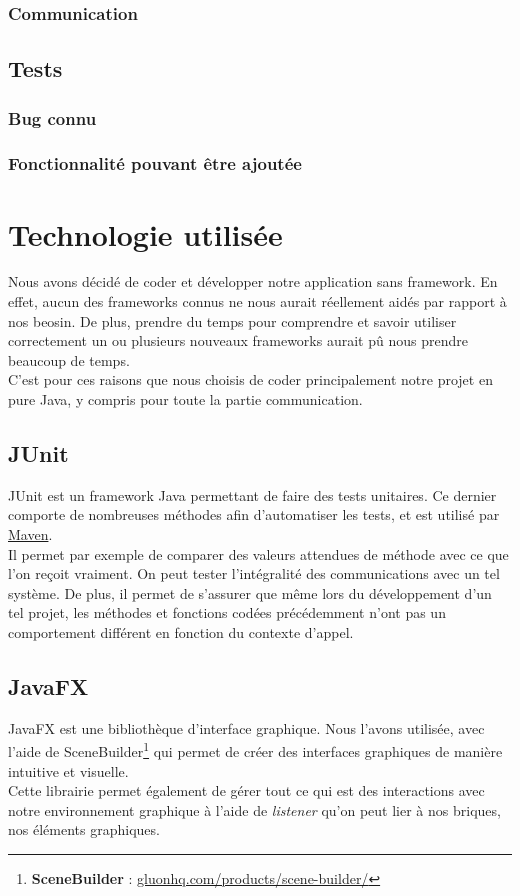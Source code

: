 \documentclass[a4paper,12pt]{article}
\begin{document}
		\subsubsection{Communication}
	
	\subsection{Tests}
	\subsubsection{Bug connu}
	
	\subsubsection{Fonctionnalité pouvant être ajoutée}
	
	\section{Technologie utilisée}
	Nous avons décidé de coder et développer notre application sans framework. En effet, aucun des frameworks connus ne nous aurait réellement aidés par rapport à nos beosin. De plus, prendre du temps pour comprendre et savoir utiliser correctement un ou plusieurs nouveaux frameworks aurait pû nous prendre beaucoup de temps. \\
	C'est pour ces raisons que nous choisis de coder principalement notre projet en pure Java, y compris pour toute la partie communication. 
	
		\subsection{JUnit}
		JUnit est un framework Java permettant de faire des tests unitaires. Ce dernier comporte de nombreuses méthodes afin d'automatiser les tests, et est utilisé par \hyperref[maven]{Maven}.\\
		Il permet par exemple de comparer des valeurs attendues de méthode avec ce que l'on reçoit vraiment. On peut tester l'intégralité des communications avec un tel système. De plus, il permet de s'assurer que même lors du développement d'un tel projet, les méthodes et fonctions codées précédemment n'ont pas un comportement différent en fonction du contexte d'appel. 
		
		\subsection{JavaFX}
		JavaFX est une bibliothèque d'interface graphique. Nous l'avons utilisée, avec l'aide de SceneBuilder\footnote{\textbf{SceneBuilder} : \href{http://gluonhq.com/products/scene-builder/}{gluonhq.com/products/scene-builder/}} qui permet de créer des interfaces graphiques de manière intuitive et visuelle. \\
		Cette librairie permet également de gérer tout ce qui est des interactions avec notre environnement graphique à l'aide de \textit{listener} qu'on peut lier à nos briques, nos éléments graphiques. 
		
\end{document}
